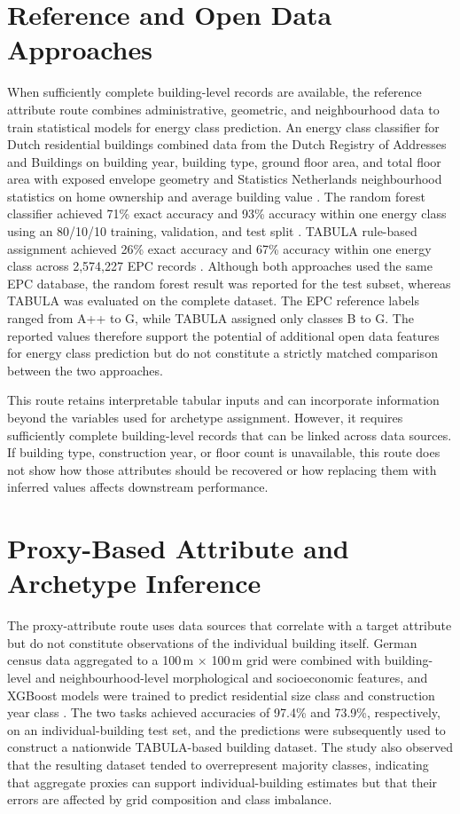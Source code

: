 \section{Reference and Open Data Approaches}
\label{sec:reference_open_data}

When sufficiently complete building-level records are available, the reference attribute route combines administrative, geometric, and neighbourhood data to train statistical models for energy class prediction. An energy class classifier for Dutch residential buildings combined data from the Dutch Registry of Addresses and Buildings on building year, building type, ground floor area, and total floor area with exposed envelope geometry and Statistics Netherlands neighbourhood statistics on home ownership and average building value \parencite{hettinga2023}. The random forest classifier achieved 71\% exact accuracy and 93\% accuracy within one energy class using an 80/10/10 training, validation, and test split \parencite{hettinga2023}. TABULA rule-based assignment achieved 26\% exact accuracy and 67\% accuracy within one energy class across 2,574,227 EPC records \parencite{hettinga2023}. Although both approaches used the same EPC database, the random forest result was reported for the test subset, whereas TABULA was evaluated on the complete dataset. The EPC reference labels ranged from A++ to G, while TABULA assigned only classes B to G. The reported values therefore support the potential of additional open data features for energy class prediction but do not constitute a strictly matched comparison between the two approaches.

This route retains interpretable tabular inputs and can incorporate information beyond the variables used for archetype assignment. However, it requires sufficiently complete building-level records that can be linked across data sources. If building type, construction year, or floor count is unavailable, this route does not show how those attributes should be recovered or how replacing them with inferred values affects downstream performance.

\section{Proxy-Based Attribute and Archetype Inference}
\label{sec:proxy_based_inference}

The proxy-attribute route uses data sources that correlate with a target attribute but do not constitute observations of the individual building itself.
German census data aggregated to a 100\,m $\times$ 100\,m grid were combined with building-level and neighbourhood-level morphological and socioeconomic features, and XGBoost models were trained to predict residential size class and construction year class \parencite{dabrock2025}.
The two tasks achieved accuracies of 97.4\% and 73.9\%, respectively, on an individual-building test set, and the predictions were subsequently used to construct a nationwide TABULA-based building dataset.
The study also observed that the resulting dataset tended to overrepresent majority classes, indicating that aggregate proxies can support individual-building estimates but that their errors are affected by grid composition and class imbalance.

